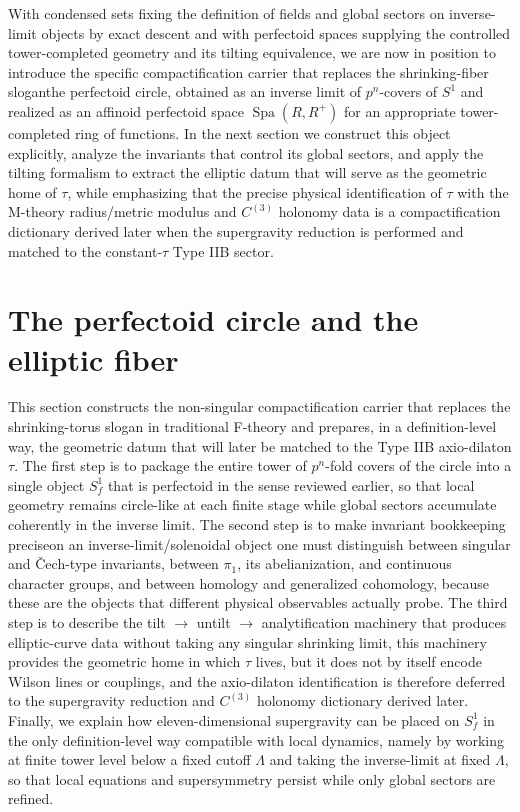 \documentclass[11pt]{article}
\theoremstyle{remark}
\DeclareMathOperator{\Spa}{Spa}
\begin{document}
With condensed sets fixing the definition of fields and global sectors on inverse-limit objects by exact descent and with perfectoid spaces supplying the controlled tower-completed geometry and its tilting equivalence, we are now in position to introduce the specific compactification carrier that replaces the shrinking-fiber slogan\:the perfectoid circle, obtained as an inverse limit of \(p^{n}\)-covers of \(S^{1}\) and realized as an affinoid perfectoid space \(\Spa(R,R^+)\) for an appropriate tower-completed ring of functions. In the next section we construct this object explicitly, analyze the invariants that control its global sectors, and apply the tilting formalism to extract the elliptic datum that will serve as the geometric home of \(\tau\), while emphasizing that the precise physical identification of \(\tau\) with the M-theory radius/metric modulus and \(C^{(3)}\) holonomy data is a compactification dictionary derived later when the supergravity reduction is performed and matched to the constant-\(\tau\) Type IIB sector.

\section{The perfectoid circle and the elliptic fiber}\label{sec:perfectoidcircle}

This section constructs the non-singular compactification carrier that replaces the shrinking-torus slogan in traditional F-theory and prepares, in a definition-level way, the geometric datum that will later be matched to the Type IIB axio-dilaton \(\tau\). The first step is to package the entire tower of \(p^{n}\)-fold covers of the circle into a single object \(S_f^1\) that is perfectoid in the sense reviewed earlier, so that local geometry remains circle-like at each finite stage while global sectors accumulate coherently in the inverse limit. The second step is to make invariant bookkeeping precise\:on an inverse-limit/solenoidal object one must distinguish between singular and \v{C}ech-type invariants, between \(\pi_1\), its abelianization, and continuous character groups, and between homology and generalized cohomology, because these are the objects that different physical observables actually probe. The third step is to describe the tilt \(\to\) untilt \(\to\) analytification machinery that produces elliptic-curve data without taking any singular shrinking limit, this machinery provides the geometric home in which \(\tau\) lives, but it does not by itself encode Wilson lines or couplings, and the axio-dilaton identification is therefore deferred to the supergravity reduction and \(C^{(3)}\) holonomy dictionary derived later. Finally, we explain how eleven-dimensional supergravity can be placed on \(S_f^1\) in the only definition-level way compatible with local dynamics, namely by working at finite tower level below a fixed cutoff \(\Lambda\) and taking the inverse-limit at fixed \(\Lambda\), so that local equations and supersymmetry persist while only global sectors are refined.
\end{document}
